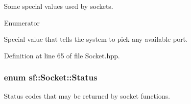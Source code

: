 Some special values used by sockets. 

\begin{Desc}
\item[Enumerator]\par
\begin{description}
\item[{\em 
\hypertarget{classsf_1_1Socket_a5deb2c955fd347259c3a20d27b2481aaa5a3c30fd128895403afc11076f461b19}{Any\-Port}\label{classsf_1_1Socket_a5deb2c955fd347259c3a20d27b2481aaa5a3c30fd128895403afc11076f461b19}
}]Special value that tells the system to pick any available port. \end{description}
\end{Desc}


Definition at line 65 of file Socket.\-hpp.

\hypertarget{classsf_1_1Socket_a51bf0fd51057b98a10fbb866246176dc}{
\subsubsection[{Status}]{\setlength{\rightskip}{0pt plus 5cm}enum {\bf sf\-::\-Socket\-::\-Status}}}\label{classsf_1_1Socket_a51bf0fd51057b98a10fbb866246176dc}


Status codes that may be returned by socket functions. 


